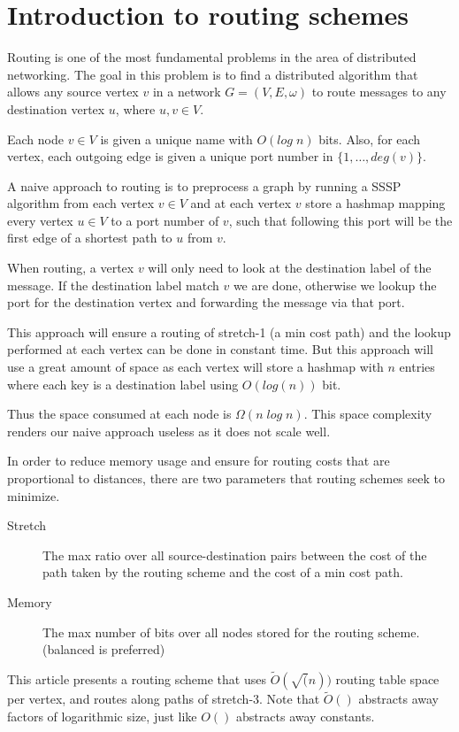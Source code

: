 \chapter{Introduction to routing schemes}

Routing is one of the most fundamental problems in the area of distributed
networking. The goal in this problem is to find a distributed algorithm that
allows any source vertex $v$ in a network $G=(V,E,\omega)$ to route messages
to any destination vertex $u$, where $u, v\in V$.

Each node $v \in V$ is given a unique name with $O(log\; n)$ bits. Also,
for each vertex, each outgoing edge is given a unique port number in
$\{1,\dots,deg(v)\}$.



A naive approach to routing is to preprocess a graph by running a SSSP %
algorithm from each vertex $v \in V$ and at each vertex $v$ store a hashmap
mapping every vertex $u\in V$ to a port number of $v$, such that following this port will be the first edge of a shortest path to $u$ from $v$.

When routing, a vertex $v$ will only need to look at the destination label
of the message. If the destination label match $v$ we are done, otherwise we 
lookup the port for the destination vertex and forwarding the message via that port.

This approach will ensure a routing of stretch-1 (a min cost path) and the lookup performed at
each vertex can be done in constant time. But this approach will use a great amount of 
space as each vertex will store a hashmap with $n$ entries where each key is a
destination label using $O(log(n))$ bit.

Thus the space consumed at each node is $\Omega (n\; log\; n)$. This space
complexity renders our naive approach useless as it does not scale well.

In order to reduce memory usage and ensure for routing costs that are proportional
to distances, there are two parameters that routing schemes seek to minimize.
\begin{description}
  \item[Stretch] The max ratio over all source-destination pairs between the
      cost of the path taken by the routing scheme and the cost of a min
      cost path.
  \item[Memory] The max number of bits over all nodes stored for the routing
      scheme. (balanced is preferred)
\end{description}
This article presents a routing scheme that uses $\tilde{O}(\sqrt(n))$
routing table space per vertex, and routes along paths of stretch-3. Note that $\tilde{O}()$ abstracts away factors of logarithmic size, just like $O()$ abstracts away constants.

